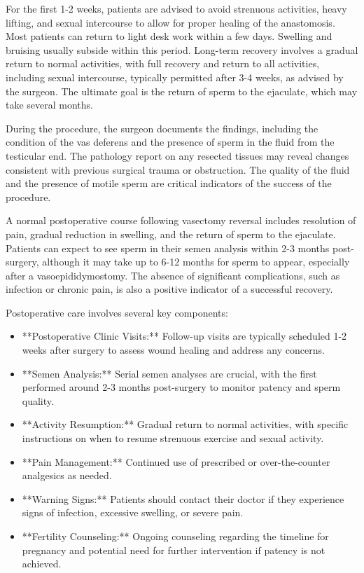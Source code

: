 For the first 1-2 weeks, patients are advised to avoid strenuous activities, heavy lifting, and sexual intercourse to allow for proper healing of the anastomosis. Most patients can return to light desk work within a few days. Swelling and bruising usually subside within this period. Long-term recovery involves a gradual return to normal activities, with full recovery and return to all activities, including sexual intercourse, typically permitted after 3-4 weeks, as advised by the surgeon. The ultimate goal is the return of sperm to the ejaculate, which may take several months.

During the procedure, the surgeon documents the findings, including the condition of the vas deferens and the presence of sperm in the fluid from the testicular end. The pathology report on any resected tissues may reveal changes consistent with previous surgical trauma or obstruction. The quality of the fluid and the presence of motile sperm are critical indicators of the success of the procedure.

A normal postoperative course following vasectomy reversal includes resolution of pain, gradual reduction in swelling, and the return of sperm to the ejaculate. Patients can expect to see sperm in their semen analysis within 2-3 months post-surgery, although it may take up to 6-12 months for sperm to appear, especially after a vasoepididymostomy. The absence of significant complications, such as infection or chronic pain, is also a positive indicator of a successful recovery.

Postoperative care involves several key components:

\begin{itemize}
  \item **Postoperative Clinic Visits:** Follow-up visits are typically scheduled 1-2 weeks after surgery to assess wound healing and address any concerns.
  
  \item **Semen Analysis:** Serial semen analyses are crucial, with the first performed around 2-3 months post-surgery to monitor patency and sperm quality.
  
  \item **Activity Resumption:** Gradual return to normal activities, with specific instructions on when to resume strenuous exercise and sexual activity.
  
  \item **Pain Management:** Continued use of prescribed or over-the-counter analgesics as needed.
  
  \item **Warning Signs:** Patients should contact their doctor if they experience signs of infection, excessive swelling, or severe pain.
  
  \item **Fertility Counseling:** Ongoing counseling regarding the timeline for pregnancy and potential need for further intervention if patency is not achieved.
\end{itemize}

